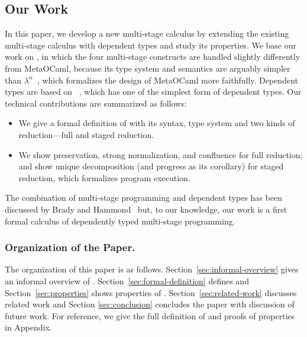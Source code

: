 
\subsection{Our Work}
In this paper, we develop a new multi-stage calculus \LMD by extending
the existing multi-stage calculus \LTP\cite{Hanada2014} with dependent
types and study its properties.  We base our work on \LTP, in which
the four multi-stage constructs are handled slightly differently from
MetaOCaml, because its type system and semantics are arguably simpler
than \(\lambda^\alpha\)~\cite{taha2003environment}, which formalizes
the design of MetaOCaml more faithfully.  Dependent types are based on
\LLF~\cite{attapl}, which has one of the simplest form of dependent
types.  Our technical contributions are summarized as follows:
\begin{itemize}
\item We give a formal definition of \LMD with its syntax, 
  type system and two kinds of reduction---full and staged reduction.
\item We show preservation, strong normalization, and confluence for
  full reduction; and show unique decomposition (and progress as its
  corollary) for staged reduction, which formalizes program execution.
\end{itemize}
The combination of multi-stage programming and dependent types has
been discussed by Brady and Hammond~\cite{brady2006dependently} but,
to our knowledge, our work is a first formal calculus of dependently
typed multi-stage programming.  

\subsubsection{Organization of the Paper.}

The organization of this paper is as follows.
Section~\ref{sec:informal-overview} gives an informal overview of
\LMD.  Section~\ref{sec:formal-definition} defines \LMD and
Section~\ref{sec:properties} shows properties of \LMD.
Section~\ref{sec:related-work} discusses related work and Section
\ref{sec:conclusion} concludes the paper with discussion of future
work.  For reference, we give the full definition of \LMD and
 proofs of properties in Appendix.
